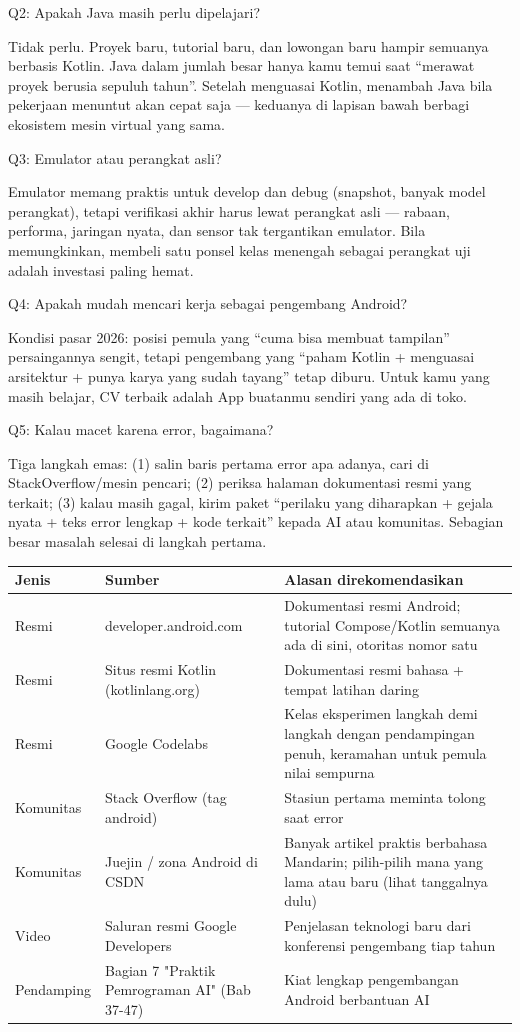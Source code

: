 Q2: Apakah Java masih perlu dipelajari?

Tidak perlu. Proyek baru, tutorial baru, dan lowongan baru hampir semuanya berbasis Kotlin. Java dalam jumlah besar hanya kamu temui saat “merawat proyek berusia sepuluh tahun”. Setelah menguasai Kotlin, menambah Java bila pekerjaan menuntut akan cepat saja — keduanya di lapisan bawah berbagi ekosistem mesin virtual yang sama.

Q3: Emulator atau perangkat asli?

Emulator memang praktis untuk develop dan debug (snapshot, banyak model perangkat), tetapi verifikasi akhir harus lewat perangkat asli — rabaan, performa, jaringan nyata, dan sensor tak tergantikan emulator. Bila memungkinkan, membeli satu ponsel kelas menengah sebagai perangkat uji adalah investasi paling hemat.

Q4: Apakah mudah mencari kerja sebagai pengembang Android?

Kondisi pasar 2026: posisi pemula yang “cuma bisa membuat tampilan” persaingannya sengit, tetapi pengembang yang “paham Kotlin + menguasai arsitektur + punya karya yang sudah tayang” tetap diburu. Untuk kamu yang masih belajar, CV terbaik adalah App buatanmu sendiri yang ada di toko.

Q5: Kalau macet karena error, bagaimana?

Tiga langkah emas: (1) salin baris pertama error apa adanya, cari di StackOverflow/mesin pencari; (2) periksa halaman dokumentasi resmi yang terkait; (3) kalau masih gagal, kirim paket “perilaku yang diharapkan + gejala nyata + teks error lengkap + kode terkait” kepada AI atau komunitas. Sebagian besar masalah selesai di langkah pertama.


\begin{center}
\begin{tabularx}{\linewidth}{|X|X|X|}
\hline
\textbf{Jenis} & \textbf{Sumber} & \textbf{Alasan direkomendasikan} \tabularnewline
\hline
Resmi & developer.android.com & Dokumentasi resmi Android; tutorial Compose/Kotlin semuanya ada di sini, otoritas nomor satu \tabularnewline
Resmi & Situs resmi Kotlin (kotlinlang.org) & Dokumentasi resmi bahasa + tempat latihan daring \tabularnewline
Resmi & Google Codelabs & Kelas eksperimen langkah demi langkah dengan pendampingan penuh, keramahan untuk pemula nilai sempurna \tabularnewline
Komunitas & Stack Overflow (tag android) & Stasiun pertama meminta tolong saat error \tabularnewline
Komunitas & Juejin / zona Android di CSDN & Banyak artikel praktis berbahasa Mandarin; pilih-pilih mana yang lama atau baru (lihat tanggalnya dulu) \tabularnewline
Video & Saluran resmi Google Developers & Penjelasan teknologi baru dari konferensi pengembang tiap tahun \tabularnewline
Pendamping & Bagian 7 "Praktik Pemrograman AI" (Bab 37-47) & Kiat lengkap pengembangan Android berbantuan AI \tabularnewline
\hline
\end{tabularx}
\end{center}

